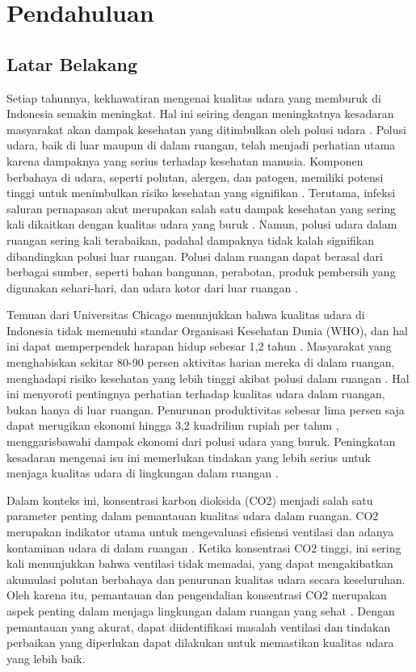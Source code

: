 \chapter{Pendahuluan}

\section{Latar Belakang}
    
    Setiap tahunnya, kekhawatiran mengenai kualitas udara yang memburuk di Indonesia semakin meningkat. Hal ini seiring dengan meningkatnya kesadaran masyarakat akan dampak kesehatan yang ditimbulkan oleh polusi udara \cite{healthconcern} \cite{healthconcern2} \cite{healthconcern3}. Polusi udara, baik di luar maupun di dalam ruangan, telah menjadi perhatian utama karena dampaknya yang serius terhadap kesehatan manusia. Komponen berbahaya di udara, seperti polutan, alergen, dan patogen, memiliki potensi tinggi untuk menimbulkan risiko kesehatan yang signifikan \cite{healthconcern4} \cite{pollutants}. Terutama, infeksi saluran pernapasan akut merupakan salah satu dampak kesehatan yang sering kali dikaitkan dengan kualitas udara yang buruk \cite{respi}. Namun, polusi udara dalam ruangan sering kali terabaikan, padahal dampaknya tidak kalah signifikan dibandingkan polusi luar ruangan. Polusi dalam ruangan dapat berasal dari berbagai sumber, seperti bahan bangunan, perabotan, produk pembersih yang digunakan sehari-hari, dan udara kotor dari luar ruangan \cite{Vardoulakis2020Indoor}.
    
    Temuan dari Universitas Chicago menunjukkan bahwa kualitas udara di Indonesia tidak memenuhi standar Organisasi Kesehatan Dunia (WHO), dan hal ini dapat memperpendek harapan hidup sebesar 1,2 tahun \cite{mortal}. Masyarakat yang menghabiskan sekitar 80-90 persen aktivitas harian mereka di dalam ruangan, menghadapi risiko kesehatan yang lebih tinggi akibat polusi dalam ruangan \cite{productivity}. Hal ini menyoroti pentingnya perhatian terhadap kualitas udara dalam ruangan, bukan hanya di luar ruangan. Penurunan produktivitas sebesar lima persen saja dapat merugikan ekonomi hingga 3,2 kuadriliun rupiah per tahun \cite{losses}, menggarisbawahi dampak ekonomi dari polusi udara yang buruk. Peningkatan kesadaran mengenai isu ini memerlukan tindakan yang lebih serius untuk menjaga kualitas udara di lingkungan dalam ruangan \cite{Wargocki2011Productivity}.
    
    Dalam konteks ini, konsentrasi karbon dioksida (CO2) menjadi salah satu parameter penting dalam pemantauan kualitas udara dalam ruangan. CO2 merupakan indikator utama untuk mengevaluasi efisiensi ventilasi dan adanya kontaminan udara di dalam ruangan \cite{Persily2022Development}. Ketika konsentrasi CO2 tinggi, ini sering kali menunjukkan bahwa ventilasi tidak memadai, yang dapat mengakibatkan akumulasi polutan berbahaya dan penurunan kualitas udara secara keseluruhan. Oleh karena itu, pemantauan dan pengendalian konsentrasi CO2 merupakan aspek penting dalam menjaga lingkungan dalam ruangan yang sehat \cite{Lowther2021Low}. Dengan pemantauan yang akurat, dapat diidentifikasi masalah ventilasi dan tindakan perbaikan yang diperlukan dapat dilakukan untuk memastikan kualitas udara yang lebih baik.
    
